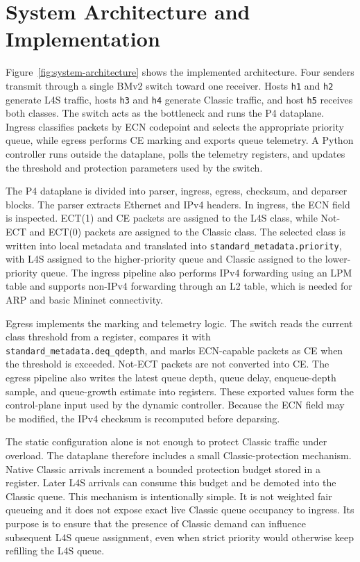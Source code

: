 \documentclass[10pt]{article}
\begin{document}
\section{System Architecture and Implementation}

Figure~\ref{fig:system-architecture} shows the implemented architecture. Four senders transmit through a single BMv2 switch toward one receiver. Hosts \texttt{h1} and \texttt{h2} generate L4S traffic, hosts \texttt{h3} and \texttt{h4} generate Classic traffic, and host \texttt{h5} receives both classes. The switch acts as the bottleneck and runs the P4 dataplane. Ingress classifies packets by ECN codepoint and selects the appropriate priority queue, while egress performs CE marking and exports queue telemetry. A Python controller runs outside the dataplane, polls the telemetry registers, and updates the threshold and protection parameters used by the switch.



The P4 dataplane is divided into parser, ingress, egress, checksum, and deparser blocks. The parser extracts Ethernet and IPv4 headers. In ingress, the ECN field is inspected. ECT(1) and CE packets are assigned to the L4S class, while Not-ECT and ECT(0) packets are assigned to the Classic class. The selected class is written into local metadata and translated into \texttt{standard\_metadata.priority}, with L4S assigned to the higher-priority queue and Classic assigned to the lower-priority queue. The ingress pipeline also performs IPv4 forwarding using an LPM table and supports non-IPv4 forwarding through an L2 table, which is needed for ARP and basic Mininet connectivity.

Egress implements the marking and telemetry logic. The switch reads the current class threshold from a register, compares it with \texttt{standard\_metadata.deq\_qdepth}, and marks ECN-capable packets as CE when the threshold is exceeded. Not-ECT packets are not converted into CE. The egress pipeline also writes the latest queue depth, queue delay, enqueue-depth sample, and queue-growth estimate into registers. These exported values form the control-plane input used by the dynamic controller. Because the ECN field may be modified, the IPv4 checksum is recomputed before deparsing.

The static configuration alone is not enough to protect Classic traffic under overload. The dataplane therefore includes a small Classic-protection mechanism. Native Classic arrivals increment a bounded protection budget stored in a register. Later L4S arrivals can consume this budget and be demoted into the Classic queue. This mechanism is intentionally simple. It is not weighted fair queueing and it does not expose exact live Classic queue occupancy to ingress. Its purpose is to ensure that the presence of Classic demand can influence subsequent L4S queue assignment, even when strict priority would otherwise keep refilling the L4S queue.
\end{document}
